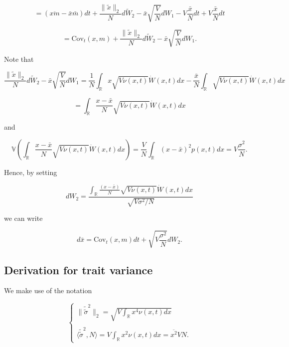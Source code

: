 \documentclass[]{article}
\begin{document}
\begin{equation*}
= (\overline{xm}-\bar x\bar m)dt+\frac{\|\tilde x\|_2}{N}d\tilde W_2
-\bar x\sqrt{\frac{V}{N}}d W_1-V\frac{\bar x}{N}dt+V\frac{\bar x}{N}dt
\end{equation*}

\begin{equation*}
=\mathrm{Cov}_t(x,m)
+\frac{\|\tilde x\|_2}{N}d\tilde W_2-\bar x\sqrt{\frac{V}{N}}d W_1.
\end{equation*}

Note that

\begin{equation}
\frac{\|\tilde x\|_2}{N}d\tilde W_2-\bar x\sqrt{\frac{V}{N}}d W_1=\frac{1}{N}\int_\mathbb{R}x\sqrt{V\nu(x,t)}\dot W(x,t)dx-\frac{\bar x}{N}\int_\mathbb{R}\sqrt{V\nu(x,t)}\dot W(x,t)dx
\end{equation}

\begin{equation*}
=\int_\mathbb{R}\frac{x-\bar x}{N}\sqrt{V\nu(x,t)}\dot W(x,t)dx
\end{equation*}

and

\begin{equation}
\mathbb{V}\left(\int_\mathbb{R}\frac{x-\bar x}{N}\sqrt{V\nu(x,t)}\dot W(x,t)dx\right)=\frac{V}{N}\int_\mathbb{R}(x-\bar x)^2p(x,t)dx=V\frac{\sigma^2}{N}.
\end{equation}

Hence, by setting

\begin{equation}
d W_2=\frac{\int_\mathbb{R}\frac{(x-\bar x)}{N}\sqrt{V\nu(x,t)}\dot W(x,t)dx}{\sqrt{V\sigma^2/N}}
\end{equation}

we can write

\begin{equation}
d\bar x=\mathrm{Cov}_t(x,m)dt
+\sqrt{V\frac{\sigma^2}{N}}d W_2.
\end{equation}

\hypertarget{derivation-for-trait-variance}{%
\subsection{Derivation for trait
variance}\label{derivation-for-trait-variance}}

We make use of the notation

\begin{equation}
\left\{\begin{matrix}
\|\tilde{\tilde\sigma}^2\|_2 = \sqrt{V\int_\mathbb{R}x^4\nu(x,t)dx} \\ \\
\langle\tilde{\tilde\sigma}^2,N\rangle=V\int_\mathbb{R}x^2\nu(x,t)dx=\overline{x^2}VN.
\end{matrix}\right.
\end{equation}
\end{document}
